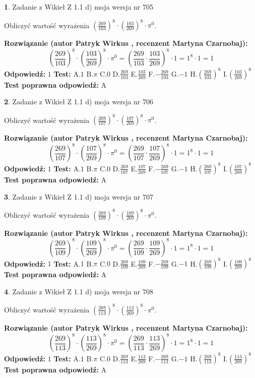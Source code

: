 \documentclass[12pt, a4paper]{article}
\theoremstyle{definition} %
\newtheorem{zad}{}
\newcommand{\zadStart}[1]{\begin{zad}#1\newline}
\newcommand{\zadStop}{\end{zad}}
\newcommand{\rozwStart}[2]{\noindent \textbf{Rozwiązanie (autor #1 , recenzent #2): }\newline}
\newcommand{\rozwStop}{\newline}
\newcommand{\odpStart}{\noindent \textbf{Odpowiedź:}\newline}
\newcommand{\odpStop}{\newline}
\newcommand{\testStart}{\noindent \textbf{Test:}\newline}
\newcommand{\testStop}{\newline}
\newcommand{\kluczStart}{\noindent \textbf{Test poprawna odpowiedź:}\newline}
\newcommand{\kluczStop}{\newline}
\begin{document}
\zadStart{Zadanie z Wikieł Z 1.1 d) moja wersja nr 705}

Obliczyć wartość wyrażenia $(\frac{269}{103})^{8} \cdot (\frac{103}{269})^{8} \cdot \pi^{0}$.
\zadStop
\rozwStart{Patryk Wirkus}{Martyna Czarnobaj}
$$(\frac{269}{103})^{8} \cdot (\frac{103}{269})^{8} \cdot \pi^{0} = (\frac{269}{103} \cdot \frac{103}{269})^{8} \cdot 1 = 1^{8} \cdot 1 = 1$$
\rozwStop
\odpStart
$1$
\odpStop
\testStart
A.$1$ B.$\pi$ C.$0$ D.$\frac{269}{103}$ E.$\frac{103}{269}$
F.$-\frac{269}{103}$ G.$-1$
H.$(\frac{269}{103})^{8}$
I.$(\frac{103}{269})^{8}$
\testStop
\kluczStart
A
\kluczStop



\zadStart{Zadanie z Wikieł Z 1.1 d) moja wersja nr 706}

Obliczyć wartość wyrażenia $(\frac{269}{107})^{8} \cdot (\frac{107}{269})^{8} \cdot \pi^{0}$.
\zadStop
\rozwStart{Patryk Wirkus}{Martyna Czarnobaj}
$$(\frac{269}{107})^{8} \cdot (\frac{107}{269})^{8} \cdot \pi^{0} = (\frac{269}{107} \cdot \frac{107}{269})^{8} \cdot 1 = 1^{8} \cdot 1 = 1$$
\rozwStop
\odpStart
$1$
\odpStop
\testStart
A.$1$ B.$\pi$ C.$0$ D.$\frac{269}{107}$ E.$\frac{107}{269}$
F.$-\frac{269}{107}$ G.$-1$
H.$(\frac{269}{107})^{8}$
I.$(\frac{107}{269})^{8}$
\testStop
\kluczStart
A
\kluczStop



\zadStart{Zadanie z Wikieł Z 1.1 d) moja wersja nr 707}

Obliczyć wartość wyrażenia $(\frac{269}{109})^{8} \cdot (\frac{109}{269})^{8} \cdot \pi^{0}$.
\zadStop
\rozwStart{Patryk Wirkus}{Martyna Czarnobaj}
$$(\frac{269}{109})^{8} \cdot (\frac{109}{269})^{8} \cdot \pi^{0} = (\frac{269}{109} \cdot \frac{109}{269})^{8} \cdot 1 = 1^{8} \cdot 1 = 1$$
\rozwStop
\odpStart
$1$
\odpStop
\testStart
A.$1$ B.$\pi$ C.$0$ D.$\frac{269}{109}$ E.$\frac{109}{269}$
F.$-\frac{269}{109}$ G.$-1$
H.$(\frac{269}{109})^{8}$
I.$(\frac{109}{269})^{8}$
\testStop
\kluczStart
A
\kluczStop



\zadStart{Zadanie z Wikieł Z 1.1 d) moja wersja nr 708}

Obliczyć wartość wyrażenia $(\frac{269}{113})^{8} \cdot (\frac{113}{269})^{8} \cdot \pi^{0}$.
\zadStop
\rozwStart{Patryk Wirkus}{Martyna Czarnobaj}
$$(\frac{269}{113})^{8} \cdot (\frac{113}{269})^{8} \cdot \pi^{0} = (\frac{269}{113} \cdot \frac{113}{269})^{8} \cdot 1 = 1^{8} \cdot 1 = 1$$
\rozwStop
\odpStart
$1$
\odpStop
\testStart
A.$1$ B.$\pi$ C.$0$ D.$\frac{269}{113}$ E.$\frac{113}{269}$
F.$-\frac{269}{113}$ G.$-1$
H.$(\frac{269}{113})^{8}$
I.$(\frac{113}{269})^{8}$
\testStop
\kluczStart
A
\kluczStop
\end{document}
